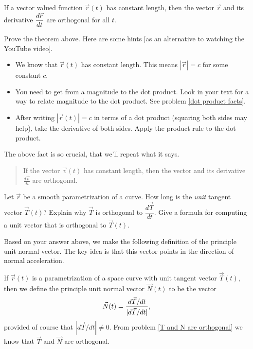 \begin{theorem}\label{vector valued functions of constant length}
 If a vector valued function $\vec r(t)$ has constant length, then the vector $\vec r$ and its derivative $\displaystyle\frac{d\vec r}{dt}$ are orthogonal for all $t$. 
\end{theorem}

\begin{problem}%
 Prove the theorem above. Here are some hints [as an alternative to watching the YouTube video].
\begin{itemize}
 \item We know that $\vec r(t)$ has constant length. This means $|\vec r|=c$ for some constant $c$. 
 \item You need to get from a magnitude to the dot product. Look in your text for a way to relate magnitude to the dot product. See problem \ref{dot product facts}.
 \item After writing $|\vec r(t)|=c$ in terms of a dot product (squaring both sides may help), take the derivative of both sides. Apply the product rule to the dot product.
\end{itemize}
\end{problem}

The above fact is so crucial, that we'll repeat what it says.
\begin{quote}
If the vector $\vec v(t)$ has constant length, then the vector and its derivative $\frac{d\vec v}{dt}$ are orthogonal.
\end{quote}


\begin{problem}\label{T and N are orthogonal}%
 Let $\vec r$ be a smooth parametrization of a curve.  How long is the {\it unit} tangent vector $\vec T(t)$? Explain why $\vec T$ is orthogonal to $\dfrac{d\vec T}{dt}$. 
 Give a formula for computing a unit vector that is orthogonal to $\vec T(t)$. 
\end{problem}

Based on your answer above, we make the following definition of the principle unit normal vector.  The key idea is that this vector points in the direction of normal acceleration. 
\begin{definition}
 If $\vec r(t)$ is a parametrization of a space curve with unit tangent vector $\vec T(t)$, then we define the principle unit normal vector $\vec N(t)$ to be the vector
 $$\vec N(t) = \displaystyle\frac{d\vec T/dt}{|d\vec T/dt|},$$
 provided of course that $|d\vec T/dt|\neq 0$. 
 From problem \ref{T and N are orthogonal} we know that $\vec T$ and $\vec N$ are orthogonal.
\end{definition}


